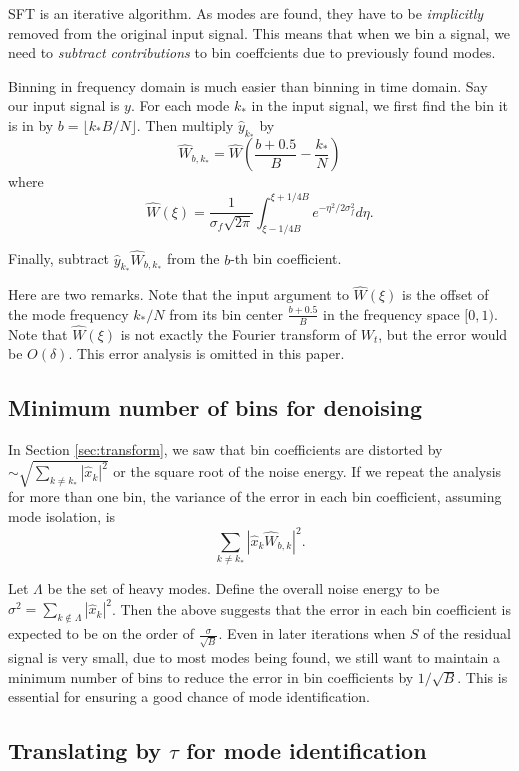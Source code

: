 \documentclass[10pt]{article}
\begin{document}
SFT is an iterative algorithm. As modes are found, they have to be \emph{implicitly} removed from the original input signal. This means that when we bin a signal, we need to \emph{subtract contributions} to bin coeffcients due to previously found modes.

Binning in frequency domain is much easier than binning in time domain. Say our input signal is $y$. For each mode $k_*$ in the input signal, we first find the bin it is in by $b = \lfloor k_* B/N \rfloor$. Then multiply $\hat{y}_{k_*}$ by
$$\hat{W}_{b,k_*} = \hat{W}\left(\frac{b+0.5}{B}-\frac{k_*}{N}\right)$$
where
$$\hat{W}(\xi)=\frac{1}{\sigma_f \sqrt{2\pi}} \int_{\xi-1/4B}^{\xi+1/4B} e^{-\eta^2/2\sigma_f^2} d\eta.$$

Finally, subtract $\hat{y}_{k_*} \hat{W}_{b,k_*}$ from the $b$-th bin coefficient.

Here are two remarks. Note that the input argument to $\hat{W}(\xi)$ is the offset of the mode frequency $k_*/N$ from its bin center $\frac{b+0.5}{B}$ in the frequency space $[0,1)$.  Note that $\hat{W}(\xi)$ is not exactly the Fourier transform of $W_t$, but the error would be $O(\delta)$. This error analysis is omitted in this paper.

\subsection{Minimum number of bins for denoising}\label{sec:permutedenoise}

In Section \ref{sec:transform}, we saw that bin coefficients are distorted by $\sim \sqrt{\sum_{k\neq k_*} |\hat{x}_k|^2}$ or the square root of the noise energy. If we repeat the analysis for more than one bin, the variance of the error in each bin coefficient, assuming mode isolation, is
$$\sum_{k\neq k_*} |\hat{x}_k \hat{W}_{b,k}|^2.$$

Let $\Lambda$ be the set of heavy modes. Define the overall noise energy to be $\sigma^2 = \sum_{k\not\in \Lambda} |\hat{x}_k|^2$. Then the above suggests that the error in each bin coefficient is expected to be on the order of $\frac{\sigma}{\sqrt{B}}$. Even in later iterations when $S$ of the residual signal is very small, due to most modes being found, we still want to maintain a minimum number of bins to reduce the error in bin coefficients by $1/\sqrt{B}$. This is essential for ensuring a good chance of mode identification.

\subsection{Translating by $\tau$ for mode identification}
\end{document}
